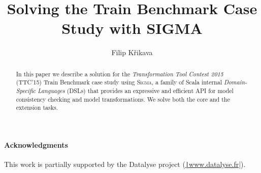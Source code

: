 \documentclass[submission]{eptcs}
\title{Solving the \TTC Train Benchmark Case Study with SIGMA}
\author{
  Filip Křikava
  \institute{University Lille 1 - LIFL, France}
  \institute{INRIA Lille, Nord Europe}
  \email{\href{mailto:filip.krikava@inria.fr}{filip.krikava@inria.fr}}
}
\newcommand{\SIGMA}{\textsc{Sigma}\xspace}
\newcommand{\TTC}{TTC'15\xspace}
\newcommand{\Scala}[1]{\texttt{#1}}
\begin{document}
\maketitle

\begin{abstract}
In this paper we describe a solution for the \emph{Transformation Tool Contest 2015} (\TTC) Train Benchmark case study using \SIGMA, a family of Scala internal \emph{Domain-Specific Languages} (DSLs) that provides an expressive and efficient API for model consistency checking and model transformations.
We solve both the core and the extension tasks.
\end{abstract}






\paragraph{Acknowledgments}
This work is partially supported by the Datalyse project (\href{http://www.datalyse.fr/}{\Scala|www.datalyse.fr|}).


	

\appendix


\end{document}
